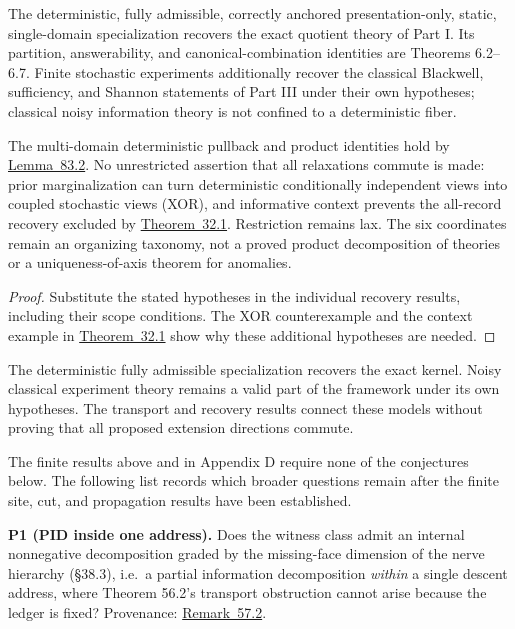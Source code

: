 \begin{thmplain}

The deterministic, fully admissible, correctly anchored presentation-only, static, single-domain specialization recovers the exact quotient theory of Part I. Its partition, answerability, and canonical-combination identities are Theorems 6.2--6.7. Finite stochastic experiments additionally recover the classical Blackwell, sufficiency, and Shannon statements of Part III under their own hypotheses; classical noisy information theory is not confined to a deterministic fiber.

The multi-domain deterministic pullback and product identities hold by \hyperlink{stmt:83.2}{Lemma~83.2}. No unrestricted assertion that all relaxations commute is made: prior marginalization can turn deterministic conditionally independent views into coupled stochastic views (XOR), and informative context prevents the all-record recovery excluded by \hyperlink{stmt:32.1}{Theorem~32.1}. Restriction remains lax. The six coordinates remain an organizing taxonomy, not a proved product decomposition of theories or a uniqueness-of-axis theorem for anomalies.
\end{thmplain}

\begin{proof}

Substitute the stated hypotheses in the individual recovery results, including their scope conditions. The XOR counterexample and the context example in \hyperlink{stmt:32.1}{Theorem~32.1} show why these additional hypotheses are needed.
\end{proof}

The deterministic fully admissible specialization recovers the exact kernel. Noisy classical experiment theory remains a valid part of the framework under its own hypotheses. The transport and recovery results connect these models without proving that all proposed extension directions commute.


The finite results above and in Appendix D require none of the conjectures below. The following list records which broader questions remain after the finite site, cut, and propagation results have been established.

\textbf{P1 (PID inside one address).} Does the witness class admit an internal nonnegative decomposition graded by the missing-face dimension of the nerve hierarchy (§38.3), i.e.~a partial information decomposition \emph{within} a single descent address, where Theorem 56.2's transport obstruction cannot arise because the ledger is fixed? Provenance: \hyperlink{stmt:57.2}{Remark~57.2}.

